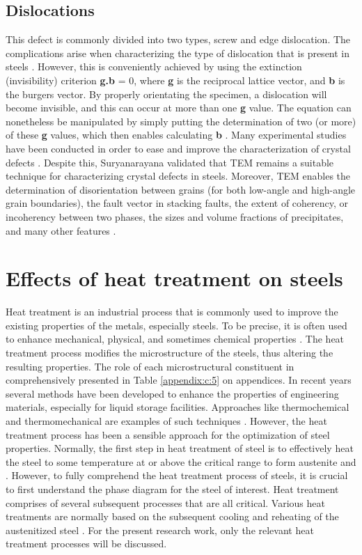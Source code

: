 \subsection{Dislocations}   
This defect is commonly divided into two types, screw and edge dislocation. The complications arise when characterizing the type of dislocation that is present in steels \cite{jones2012engineering}. However, this is conveniently achieved by using the extinction (invisibility) criterion \textbf{g.b} = 0, where \textbf{g} is the reciprocal lattice vector, and \textbf{b} is the burgers vector. By properly orientating the specimen, a dislocation will become invisible, and this can occur at more than one \textbf{g} value. The equation can nonetheless be manipulated by simply putting the determination of two (or more) of these \textbf{g} values, which then enables calculating \textbf{b} \cite{suryanarayana2017microstructure}. 
Many experimental studies have been conducted in order to ease and improve the characterization of crystal defects \cite{george2002introduction, bhadeshia2017steels, karayan2014weld}. Despite this, Suryanarayana \cite{suryanarayana2017microstructure} validated that TEM remains a suitable technique for characterizing crystal defects in steels. Moreover, TEM enables the determination of disorientation between grains (for both low-angle and high-angle grain boundaries), the fault vector in stacking faults, the extent of coherency, or incoherency between two phases, the sizes and volume fractions of precipitates, and many other features \cite{suryanarayana2017microstructure}.

\section{Effects of heat treatment on steels} 
Heat treatment is an industrial process that is commonly used to improve the existing properties of the metals, especially steels. To be precise, it is often used to enhance mechanical, physical, and sometimes chemical properties \cite{mampuya2021effect}. The heat treatment process modifies the microstructure of the steels, thus altering the resulting properties. The role of each microstructural constituent in comprehensively presented in Table \ref{appendix:c:5} on appendices. In recent years several methods have been developed to enhance the properties of engineering materials, especially for liquid storage facilities. Approaches like thermochemical and thermomechanical are examples of such techniques \cite{singh2020applied}. However, the heat treatment process has been a sensible approach for the optimization of steel properties.
Normally, the first step in heat treatment of steel is to effectively heat the steel to some temperature at or above the critical range to form austenite and  \cite{mampuya2021effect}. However, to fully comprehend the heat treatment process of steels, it is crucial to first understand the phase diagram for the steel of interest. Heat treatment comprises of several subsequent processes that are all critical. Various heat treatments are normally based on the subsequent cooling and reheating of the austenitized steel \cite{singh2020applied}.  For the present research work, only the relevant heat treatment processes will be discussed.

